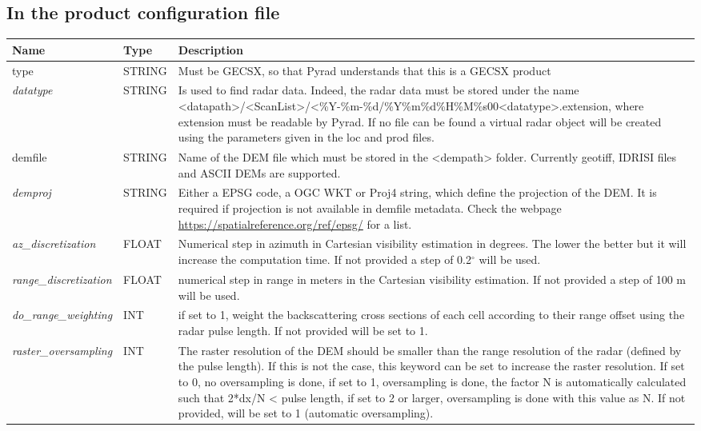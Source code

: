 \documentclass[a4paper,11pt,pdftex,twoside]{scrartcl}
\renewcommand{\bf}{\normalfont \bfseries}
\begin{document}
{{{\subsection{In the product configuration file}


\begin{longtable}{p{}p{}p{}}
\bf{Name}          & \bf{Type} & \bf{Description}\\
\hline
type & STRING & Must be GECSX, so that Pyrad understands that this is a GECSX product \\
\textit{datatype} & STRING & Is used to find radar data. Indeed, the radar data must be stored under the name <datapath>/<ScanList>/<\%Y-\%m-\%d/\%Y\%m\%d\%H\%M\%s00<datatype>.extension, where extension must be readable by Pyrad. If no file can be found a virtual radar object will be created using the parameters given in the loc and prod files.\\
    demfile & STRING & Name of the DEM file which must be stored in the <dempath> folder. Currently geotiff, IDRISI files and ASCII DEMs are supported. \\
    \textit{demproj} & STRING & Either a EPSG code, a OGC WKT or Proj4 string, which define the projection of the DEM. It is required if projection is not available in demfile metadata. Check the webpage \url{https://spatialreference.org/ref/epsg/} for a list. \\
    \textit{az\_discretization}  &  FLOAT & Numerical step in azimuth in Cartesian visibility estimation in degrees. The lower the better but it will increase the computation time. If not provided a step of 0.2$^{\circ}$ will be used. \\
    \textit{range\_discretization} & FLOAT & numerical step in range in meters in the Cartesian visibility estimation. If not provided a step of 100 m will be used. \\
    \textit{do\_range\_weighting} & INT & if set to 1, weight the backscattering cross sections of each cell according to their range offset using the radar pulse length. If not provided will be set to 1. \\
    \textit{raster\_oversampling} & INT & The raster resolution of the DEM should be smaller than
        the range resolution of the radar (defined by the pulse length). If this is not the case, this keyword can be set to increase the raster resolution. If set to 0, no oversampling is done, if set to 1, oversampling is done, the factor N is automatically calculated   such that 2*dx/N < pulse length, if set to 2 or larger, oversampling is done with this value as N. If not provided, will be set to 1 (automatic oversampling).  \\

\end{longtable}}}}
\end{document}

